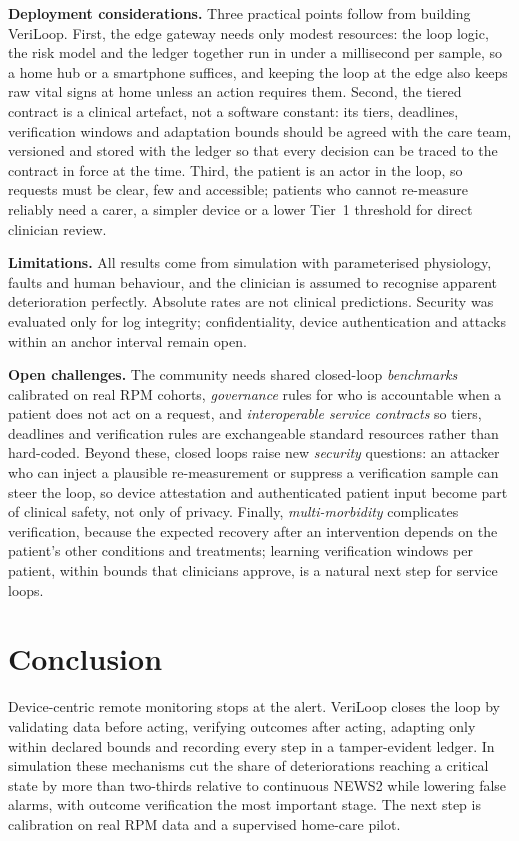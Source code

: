 \documentclass[journal,twoside,web]{IEEEmiot}
\begin{document}
\textbf{Deployment considerations.} Three practical points follow from building VeriLoop. First, the edge gateway
needs only modest resources: the loop logic, the risk model and the ledger together run in under a millisecond per
sample, so a home hub or a smartphone suffices, and keeping the loop at the edge also keeps raw vital signs at home
unless an action requires them. Second, the tiered contract is a clinical artefact, not a software constant: its tiers,
deadlines, verification windows and adaptation bounds should be agreed with the care team, versioned and stored with
the ledger so that every decision can be traced to the contract in force at the time. Third, the patient is an actor in
the loop, so requests must be clear, few and accessible; patients who cannot re-measure reliably need a carer, a
simpler device or a lower Tier~1 threshold for direct clinician review.

\textbf{Limitations.} All results come from simulation with parameterised physiology, faults and human behaviour, and
the clinician is assumed to recognise apparent deterioration perfectly. Absolute rates are not clinical predictions.
Security was evaluated only for log integrity; confidentiality, device authentication and attacks within an anchor
interval remain open.

\textbf{Open challenges.} The community needs shared closed-loop \emph{benchmarks} calibrated on real RPM cohorts,
\emph{governance} rules for who is accountable when a patient does not act on a request, and \emph{interoperable service
contracts} so tiers, deadlines and verification rules are exchangeable standard resources rather than hard-coded.
Beyond these, closed loops raise new \emph{security} questions: an attacker who can inject a plausible re-measurement
or suppress a verification sample can steer the loop, so device attestation and authenticated patient input become
part of clinical safety, not only of privacy. Finally, \emph{multi-morbidity} complicates verification, because the
expected recovery after an intervention depends on the patient's other conditions and treatments; learning
verification windows per patient, within bounds that clinicians approve, is a natural next step for service loops.

\section{Conclusion}

Device-centric remote monitoring stops at the alert. VeriLoop closes the loop by validating data before acting,
verifying outcomes after acting, adapting only within declared bounds and recording every step in a tamper-evident
ledger. In simulation these mechanisms cut the share of deteriorations reaching a critical state by more than
two-thirds relative to continuous NEWS2 while lowering false alarms, with outcome verification the most important
stage. The next step is calibration on real RPM data and a supervised home-care pilot.
\end{document}
